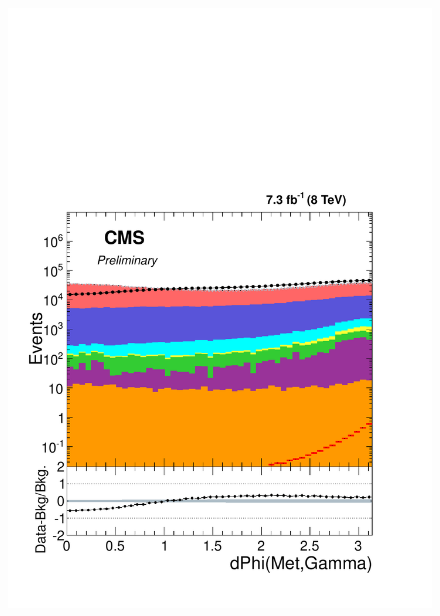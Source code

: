 \begin{figure}[!hp]
\centering
{\label{fig:pg_rw_phi_b}\includegraphics[scale=0.4]{analysis_figs/dphi_noreweight.pdf}}

\end{figure}
